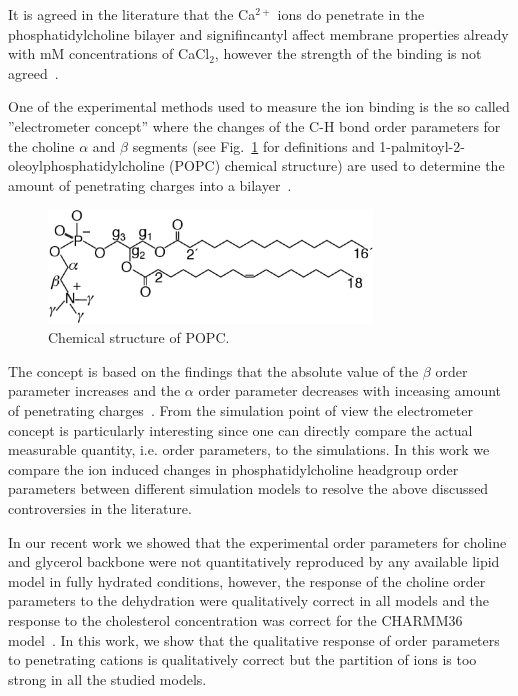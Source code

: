 \documentclass[pre,aps,floatfix,authordate1-4,twocolumn]{revtex4-1}
\begin{document}
It is agreed in the literature that the Ca$^{2+}$ ions do penetrate in the phosphatidylcholine bilayer and
signifincantyl affect membrane properties already with mM concentrations of CaCl$_2$, however the strength of the binding is not agreed~\cite{tatulian87,altenbach84,bockmann04}.


One of the experimental methods used to measure the ion binding is the so called
''electrometer concept'' where the changes of the C-H bond order parameters for the 
choline $\alpha$ and $\beta$ segments (see Fig.~\ref{POPCstructure} for definitions and 1-palmitoyl-2-oleoylphosphatidylcholine (POPC) 
chemical structure) are used to determine the amount of penetrating charges into a bilayer~\cite{akutsu81,altenbach84,seelig87,scherer89}.
\begin{figure}[]
  \centering
  \includegraphics[width=8.6cm]{../Fig/POPCstructure.eps}

  \caption{\label{POPCstructure}
    Chemical structure of POPC.}
  
\end{figure}
The concept is based on the findings that the absolute value of the $\beta$ order parameter
increases and the $\alpha$ order parameter decreases with inceasing amount of penetrating 
charges~\cite{akutsu81,altenbach84,seelig87,scherer89}. 
From the simulation point of view the electrometer concept is particularly interesting since one
can directly compare the actual measurable quantity, i.e. order parameters, to the simulations.
In this work we compare the ion induced changes in phosphatidylcholine headgroup order parameters
between different simulation models to resolve the above discussed controversies in the literature.


In our recent work we showed that the experimental order parameters for choline and glycerol backbone were not
quantitatively reproduced by any available lipid model in fully hydrated conditions, however, the response of the choline order parameters
to the dehydration were qualitatively correct in all models and the response to the cholesterol  concentration
was correct for the CHARMM36 model~\cite{botan15}. In this work, we show that the qualitative response of order parameters
to penetrating cations is qualitatively correct but the partition of ions is too strong in all the studied models.
\end{document}
